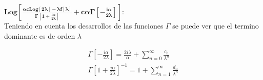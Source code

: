 \begin{comment}
\textbf{Log[S2]:} \\

S2 es una serie de potencias que tiende a 1 en $\lambda \rightarrow \infty$, entonces tiene la forma:

\begin{equation}
S2 = 1 + \sum _{n=1} ^{\infty} \frac{a _n}{\lambda ^n}
\end{equation}

Debido a que $S2$ tiende a $0$, puedo resarrollar su derivada logaritmica y me cambia la primer potencia que aparece, siendo $\frac{1}{\lambda ^ 2}$:


\begin{equation}
\partial _{\lambda} Log[S2] = 
\frac{
    \sum _{n=1} ^{\infty} \frac{(-n) a_n}{\lambda ^{n+1}} }{1 + \sum _{n=1} ^{\infty} \frac{a _n}{\lambda ^n} }
= \sum _{n=2} ^{\infty} \frac{b _n}{\lambda ^n}
\end{equation}

De aquí se puede ver que este termino de la suma contribuira a polos simples, en los semienteros (como pasa en el problema regular), siendo la primer contribucion en $s=-1/2$ \\

$\mathbf{
- \frac{i \alpha}{2 \lambda} Log[2 \lambda L]} : 
$ \\

Este termino es el mismo que aparecía en el problema regular, y va a contribuir a un polo doble en $s=-1/2$  \\



En La rama de abajo voy a tener dos terminos que se comportan diferente que los anteriores:

$\mathbf{
		Log[\Gamma [ 1 - \frac{i \alpha}{2 \lambda} ] ]
		}: 
		$ \\

\end{comment}

$\mathbf{
Log[
	\frac{\alpha c Log[2 \lambda] - \lambda f[\lambda] }{\Gamma \left[1 + \frac{i \alpha}{ 2 \lambda} \right] } + 
	c \alpha \Gamma \left[ - \frac{i \alpha}{2 \lambda} \right] ] :
}$ \\

Teniendo en cuenta los desarrollos de las funciones $\Gamma$ se puede ver que el termino dominante es de orden $\lambda$


\begin{equation}
\begin{array}{c}
\Gamma [- \frac{i \alpha}{2 \lambda}] = 
\frac{2 i \lambda}{\alpha}  + 
\sum _{n=0} ^{\infty} \frac{c _n}{\lambda ^n} \\
\Gamma \left[ 1 + \frac{i \alpha}{2 \lambda} \right] ^{-1} = 1 + 
\sum _{n=1} ^{\infty} \frac{d _n}{\lambda ^n}
\end{array}
\end{equation}

